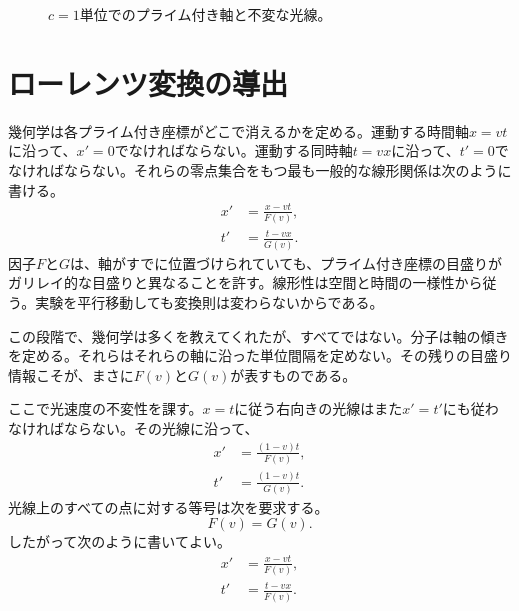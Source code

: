 \begin{figure}[H]
\centering
{}
\caption{\(c=1\)単位でのプライム付き軸と不変な光線。}
\end{figure}

\section{ローレンツ変換の導出}

幾何学は各プライム付き座標がどこで消えるかを定める。運動する時間軸\(x=vt\)に沿って、\(x'=0\)でなければならない。運動する同時軸\(t=vx\)に沿って、\(t'=0\)でなければならない。それらの零点集合をもつ最も一般的な線形関係は次のように書ける。
\begin{align}
x'&=\frac{x-vt}{F(v)},\\
t'&=\frac{t-vx}{G(v)}.
\label{eq:fg-ansatz}
\end{align}
因子\(F\)と\(G\)は、軸がすでに位置づけられていても、プライム付き座標の目盛りがガリレイ的な目盛りと異なることを許す。線形性は空間と時間の一様性から従う。実験を平行移動しても変換則は変わらないからである。

この段階で、幾何学は多くを教えてくれたが、すべてではない。分子は軸の傾きを定める。それらはそれらの軸に沿った単位間隔を定めない。その残りの目盛り情報こそが、まさに\(F(v)\)と\(G(v)\)が表すものである。

ここで光速度の不変性を課す。\(x=t\)に従う右向きの光線はまた\(x'=t'\)にも従わなければならない。その光線に沿って、
\begin{align}
x'&=\frac{(1-v)t}{F(v)},\\
t'&=\frac{(1-v)t}{G(v)}.
\end{align}
光線上のすべての点に対する等号は次を要求する。
\begin{equation}
F(v)=G(v).
\end{equation}
したがって次のように書いてよい。
\begin{align}
x'&=\frac{x-vt}{F(v)},\\
t'&=\frac{t-vx}{F(v)}.
\label{eq:common-f}
\end{align}

